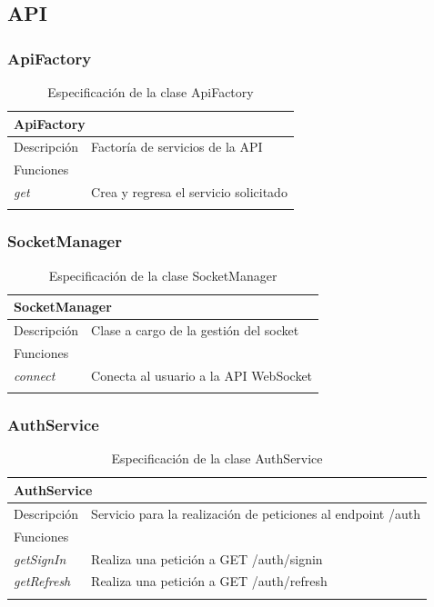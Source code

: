 \vspace{-30pt}
\subsection{API}

\vspace{-10pt}
\subsubsection{ApiFactory}

\begin{longtable}{|p{} p{}|}
    \hline
    \multicolumn{2}{|l|}{ApiFactory} \\ \hline \hline
    Descripción      & Factoría de servicios de la API \\ \hline
    \multicolumn{2}{|l|}{Funciones} \\
    \emph{get}  & Crea y regresa el servicio solicitado \\ \hline
    \caption{Especificación de la clase ApiFactory}
    \label{class:app:api_factory}
\end{longtable}

\vspace{-20pt}
\subsubsection{SocketManager}

\begin{longtable}{|p{} p{}|}
    \hline
    \multicolumn{2}{|l|}{SocketManager} \\ \hline \hline
    Descripción      & Clase a cargo de la gestión del socket \\ \hline
    \multicolumn{2}{|l|}{Funciones} \\
    \emph{connect}  & Conecta al usuario a la API WebSocket \\ \hline
    \caption{Especificación de la clase SocketManager}
    \label{class:app:socket_manager}
\end{longtable}

\vspace{-20pt}
\subsubsection{AuthService}

\begin{longtable}{|p{} p{}|}
    \hline
    \multicolumn{2}{|l|}{AuthService} \\ \hline \hline
    Descripción      & Servicio para la realización de peticiones al endpoint /auth \\ \hline
    \multicolumn{2}{|l|}{Funciones} \\
    \emph{getSignIn}  & Realiza una petición a GET /auth/signin \\
    \emph{getRefresh}  & Realiza una petición a GET /auth/refresh \\ \hline
    \caption{Especificación de la clase AuthService}
    \label{class:app:auth_service}
\end{longtable}

